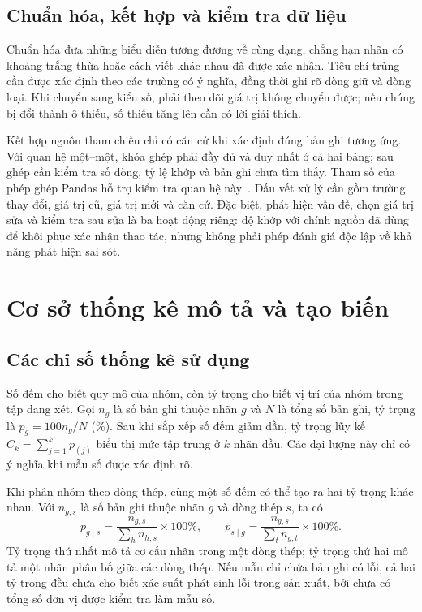 \subsection{Chuẩn hóa, kết hợp và kiểm tra dữ liệu}

Chuẩn hóa đưa những biểu diễn tương đương về cùng dạng, chẳng hạn nhãn có khoảng trắng thừa hoặc cách viết khác nhau đã được xác nhận. Tiêu chí trùng cần được xác định theo các trường có ý nghĩa, đồng thời ghi rõ dòng giữ và dòng loại. Khi chuyển sang kiểu số, phải theo dõi giá trị không chuyển được; nếu chúng bị đổi thành ô thiếu, số thiếu tăng lên cần có lời giải thích.

Kết hợp nguồn tham chiếu chỉ có căn cứ khi xác định đúng bản ghi tương ứng. Với quan hệ một--một, khóa ghép phải đầy đủ và duy nhất ở cả hai bảng; sau ghép cần kiểm tra số dòng, tỷ lệ khớp và bản ghi chưa tìm thấy. Tham số  của phép ghép Pandas hỗ trợ kiểm tra quan hệ này~\cite{pandasmerge}. Dấu vết xử lý cần gồm trường thay đổi, giá trị cũ, giá trị mới và căn cứ. Đặc biệt, phát hiện vấn đề, chọn giá trị sửa và kiểm tra sau sửa là ba hoạt động riêng: độ khớp với chính nguồn đã dùng để khôi phục xác nhận thao tác, nhưng không phải phép đánh giá độc lập về khả năng phát hiện sai sót.

\section{Cơ sở thống kê mô tả và tạo biến}
\label{sec:thongke}

\subsection{Các chỉ số thống kê sử dụng}

Số đếm cho biết quy mô của nhóm, còn tỷ trọng cho biết vị trí của nhóm trong tập đang xét. Gọi $n_g$ là số bản ghi thuộc nhãn $g$ và $N$ là tổng số bản ghi, tỷ trọng là $p_g=100n_g/N$ (\%). Sau khi sắp xếp số đếm giảm dần, tỷ trọng lũy kế $C_k=\sum_{j=1}^{k}p_{(j)}$ biểu thị mức tập trung ở $k$ nhãn đầu. Các đại lượng này chỉ có ý nghĩa khi mẫu số được xác định rõ.

Khi phân nhóm theo dòng thép, cùng một số đếm có thể tạo ra hai tỷ trọng khác nhau. Với $n_{g,s}$ là số bản ghi thuộc nhãn $g$ và dòng thép $s$, ta có
\begin{equation}
  p_{g\mid s}=\frac{n_{g,s}}{\sum_h n_{h,s}}\times100\%,
  \qquad
  p_{s\mid g}=\frac{n_{g,s}}{\sum_t n_{g,t}}\times100\%.
  \label{eq:tytronghaichieu}
\end{equation}
Tỷ trọng thứ nhất mô tả cơ cấu nhãn trong một dòng thép; tỷ trọng thứ hai mô tả một nhãn phân bố giữa các dòng thép. Nếu mẫu chỉ chứa bản ghi có lỗi, cả hai tỷ trọng đều chưa cho biết xác suất phát sinh lỗi trong sản xuất, bởi chưa có tổng số đơn vị được kiểm tra làm mẫu số.

